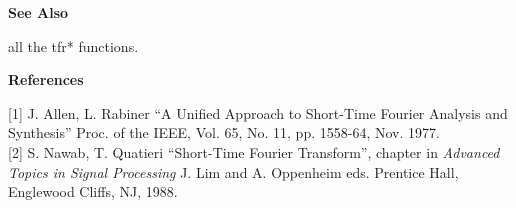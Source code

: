 {\bf \large \sf See Also}\\
\hspace*{1.5cm}
\begin{minipage}[t]{13.5cm}
all the {\ty tfr*} functions.
\end{minipage}
\vspace*{.5cm}

{\bf \large \sf References}\\
\hspace*{1.5cm}
\begin{minipage}[t]{13.5cm}
[1] J. Allen, L. Rabiner ``A Unified Approach to Short-Time Fourier
Analysis and Synthesis'' Proc. of the IEEE, Vol. 65, No. 11, pp. 1558-64,
Nov. 1977.\\

[2] S. Nawab, T. Quatieri ``Short-Time Fourier Transform'', chapter in {\it
Advanced Topics in Signal Processing} J. Lim and A. Oppenheim
eds. Prentice Hall, Englewood Cliffs, NJ, 1988.
\end{minipage}
